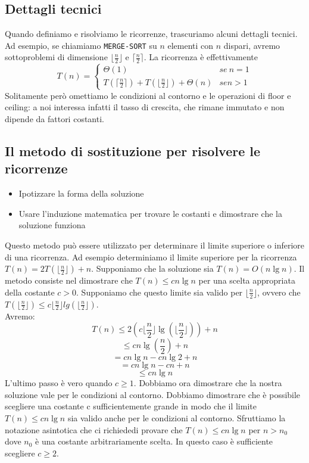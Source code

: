 \documentclass[11pt,a4paper]{article}
\begin{document}
\subsection{Dettagli tecnici}
Quando definiamo e risolviamo le ricorrenze, trascuriamo alcuni dettagli tecnici. Ad esempio, se chiamiamo
\texttt{MERGE-SORT} su $n$ elementi con $n$ dispari, avremo sottoproblemi di dimensione $\lfloor\frac{n}{2}\rfloor$ e $\lceil \frac{n}{2} \rceil$. La ricorrenza è effettivamente
\[T(n)= \begin{cases}
          \Theta(1) & se\ n=1\\
          T(\lceil \frac{n}{2} \rceil) + T(\lfloor \frac{n}{2} \rfloor) + \Theta(n) & se n > 1
        \end{cases}
\]
%
Solitamente però omettiamo le condizioni al contorno e le operazioni di floor e ceiling: a noi interessa infatti il tasso di crescita, che rimane immutato e non dipende da fattori costanti.

\subsection{Il metodo di sostituzione per risolvere le ricorrenze}
\begin{itemize}
  \item Ipotizzare la forma della soluzione
  \item Usare l’induzione matematica per trovare le costanti e dimostrare che la soluzione funziona
\end{itemize}
%
Questo metodo può essere utilizzato per determinare il limite superiore o inferiore di una ricorrenza.
Ad esempio determiniamo il limite superiore per la ricorrenza $T(n) = 2T(\lfloor \frac{n}{2} \rfloor) + n$.
Supponiamo che la soluzione sia $T(n) = O(n \lg n)$.
Il metodo consiste nel dimostrare che $T(n) \leq cn \lg n$ per una scelta appropriata della costante $c > 0$.
Supponiamo che questo limite sia valido per $\lfloor\frac{n}{2}\rfloor$, ovvero che $T(\lfloor \frac{n}{2} \rfloor) \leq c\lfloor \frac{n}{2} \rfloor lg ( \lfloor \frac{n}{2} \rfloor )$.\medskip\\
Avremo:
\[T(n) \leq 2(c\lfloor \frac{n}{2} \rfloor \lg ( \lfloor \frac{n}{2} \rfloor ) ) + n \]
\[\leq cn \lg (\frac{n}{2}) + n \]
\[= cn \lg n - cn \lg 2 + n \]
\[= cn \lg n - cn + n \]
\[\leq cn \lg n \]
L’ultimo passo è vero quando $c \geq 1$.
Dobbiamo ora dimostrare che la nostra soluzione vale per le condizioni al contorno.
Dobbiamo dimostrare che è possibile scegliere una costante c sufficientemente grande in modo che il limite
$T(n) \leq cn \lg n$ sia valido anche per le condizioni al contorno. Sfruttiamo la notazione asintotica che ci richiededi provare che $T(n) \leq cn \lg n$ per $n > n_0$ dove $n_0$ è una costante arbitrariamente scelta. In questo caso è
sufficiente scegliere $c \geq 2$.
\end{document}
